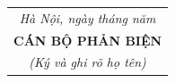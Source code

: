 \documentclass[DoAn.tex]{subfiles}
\begin{document}
\vspace{0.05cm}


\begin{flushright}
\begin{tabular}{@{}c@{}}
\textit{Hà Nội, ngày \underline{\hspace{0.9cm}} tháng \underline{\hspace{0.9cm}} năm \underline{\hspace{0.9cm}}}\\[0.15cm]
\textbf{CÁN BỘ PHẢN BIỆN}\\
\textit{(Ký và ghi rõ họ tên)}
\end{tabular}
\end{flushright}

\restoregeometry
\end{document}
